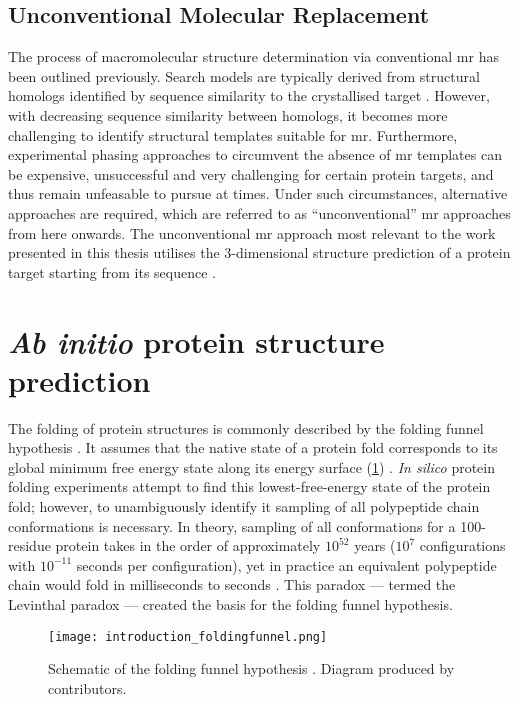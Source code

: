 \subsection{Unconventional Molecular Replacement}
The process of macromolecular structure determination via conventional \gls{mr} has been outlined previously. Search models are typically derived from structural homologs identified by sequence similarity to the crystallised target \cite{Rupp2010-nc}. However, with decreasing sequence similarity between homologs, it becomes more challenging to identify structural templates suitable for \gls{mr}. Furthermore, experimental phasing approaches to circumvent the absence of \gls{mr} templates can be expensive, unsuccessful and very challenging for certain protein targets, and thus remain unfeasable to pursue at times. Under such circumstances, alternative approaches are required, which are referred to as ``unconventional'' \gls{mr} approaches from here onwards. The unconventional \gls{mr} approach most relevant to the work presented in this thesis utilises the 3-dimensional structure prediction of a protein target starting from its sequence \cite{Qian2007-vo,Rigden2008-vo,Das2009-uz}. 
 
\section{\textit{Ab initio} protein structure prediction}
The folding of protein structures is commonly described by the folding funnel hypothesis \cite{Leopold1992-yf}. It assumes that the native state of a protein fold corresponds to its global minimum free energy state along its energy surface (\cref{fig:introduction_foldingfunnel}) \cite{Anfinsen1973-in}. \textit{In silico} protein folding experiments attempt to find this lowest-free-energy state of the protein fold; however, to unambiguously identify it sampling of all polypeptide chain conformations is necessary. In theory, sampling of all conformations for a 100-residue protein takes in the order of approximately $10^{52}$ years ($10^7$ configurations with $10^{-11}$ seconds per configuration), yet in practice an equivalent polypeptide chain would fold in milliseconds to seconds \cite{Levinthal1969-bn,Karplus2011-jh}. This paradox --- termed the Levinthal paradox \cite{Levinthal1969-bn} --- created the basis for the folding funnel hypothesis.  

\begin{figure}[H]
    \centering
    \texttt{[image: introduction\_foldingfunnel.png]}
    \caption{Schematic of the folding funnel hypothesis \cite{Leopold1992-yf}. Diagram produced by \textcite{Wikipedia-FoldingFunnel} contributors.}
    \label{fig:introduction_foldingfunnel}
\end{figure}

